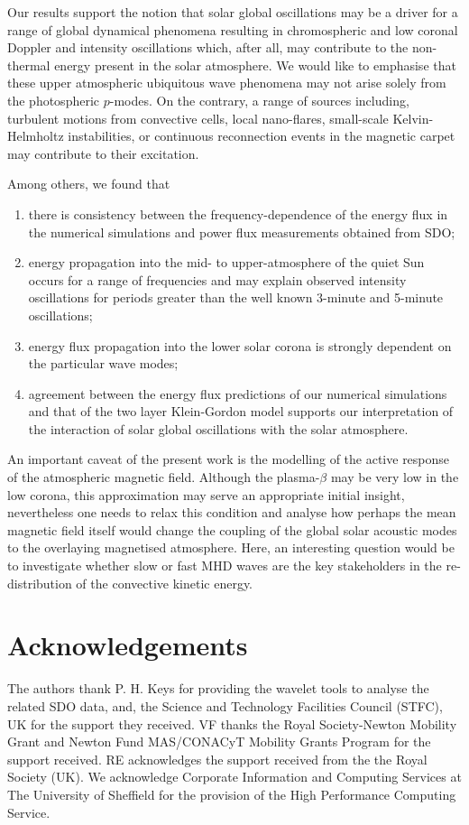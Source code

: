 \documentclass[preprint,authoryear,12pt]{elsarticle}
\begin{document}
Our results support the notion that solar global oscillations may be a driver for a range of global dynamical phenomena 
resulting in chromospheric and low coronal Doppler and intensity oscillations which, after all, may contribute to the non-thermal energy present in the solar atmosphere. We would like to emphasise that these upper atmospheric ubiquitous wave phenomena may not arise solely from the photospheric $p$-modes. On the contrary, a range of sources including, turbulent motions from convective cells, local nano-flares, small-scale Kelvin-Helmholtz instabilities, or continuous reconnection events in the magnetic carpet may contribute to their excitation. 

Among others, we found that
   \begin{enumerate}
      \item there is consistency between the frequency-dependence of the energy flux in the numerical simulations and power 
      flux measurements obtained from SDO;
      \item energy propagation into the mid- to upper-atmosphere of the quiet Sun occurs for a range of frequencies and may explain observed intensity oscillations for periods greater than the well known 3-minute and 5-minute oscillations; 
      \item energy flux propagation into the lower solar corona is strongly dependent on the particular wave modes;
 \item agreement between the energy flux predictions of our numerical simulations and that of the two layer 
      Klein-Gordon model supports our interpretation of the interaction of solar global oscillations with the solar atmosphere.
   \end{enumerate}

An important caveat of the present work is the modelling of the active response of the atmospheric magnetic field. Although the plasma-$\beta$ may be very low in the low corona, this approximation may serve an appropriate initial insight, nevertheless one needs to relax this condition and analyse how perhaps the mean magnetic field itself would change the coupling of the global solar acoustic modes to the overlaying magnetised atmosphere. Here, an interesting question would be to investigate whether slow or fast MHD waves are the key stakeholders in the re-distribution of the convective kinetic energy.  

\section{Acknowledgements}
 The authors thank P. H. Keys for providing the wavelet tools to analyse the related SDO data, and, the Science and Technology Facilities Council (STFC), UK for the support they received. 
VF thanks the Royal Society-Newton Mobility Grant and Newton Fund MAS/CONACyT Mobility
Grants Program for the support received. RE acknowledges the support received from the the Royal Society (UK). 
We acknowledge Corporate Information and Computing Services at The University of Sheffield for the provision of the High Performance Computing Service.
\end{document}
